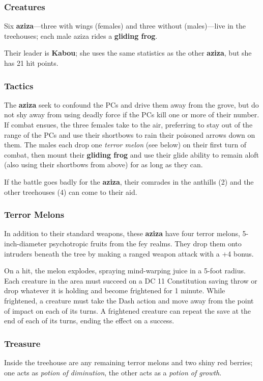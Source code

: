 \documentclass[10pt,a4paper,twoside,bg=print,twocolumn,openany,nodeprecatedcode]{dndbook}
\begin{document}
\subsubsection{Creatures}
Six \textbf{aziza}—three with wings (females) and three without (males)—live in the treehouses; each male aziza rides a \textbf{gliding frog}.

Their leader is \textbf{Kabou}; she uses the same statistics as the other \textbf{aziza}, but she has 21 hit points.

\subsubsection{Tactics}
The \textbf{aziza} seek to confound the PCs and drive them away from the grove, but do not shy away from using deadly force if the PCs kill one or more of their number. If combat ensues, the three females take to the air, preferring to stay out of the range of the PCs and use their shortbows to rain their poisoned arrows down on them. The males each drop one \textit{terror melon} (see below) on their first turn of combat, then mount their \textbf{gliding frog} and use their glide ability to remain aloft (also using their shortbows from above) for as long as they can.

If the battle goes badly for the \textbf{aziza}, their comrades in the anthills (2) and the other treehouses (4) can come to their aid.

\subsubsection{Terror Melons}
In addition to their standard weapons, these \textbf{aziza} have four terror melons, 5-inch-diameter psychotropic fruits from the fey realms. They drop them onto intruders beneath the tree by making a ranged weapon attack with a +4 bonus.

On a hit, the melon explodes, spraying mind-warping juice in a 5-foot radius. Each creature in the area must succeed on a DC 11 Constitution saving throw or drop whatever it is holding and become frightened for 1 minute. While frightened, a creature must take the Dash action and move away from the point of impact on each of its turns. A frightened creature can repeat the save at the end of each of its turns, ending the effect on a success.

\subsubsection{Treasure}
Inside the treehouse are any remaining terror melons and two shiny red berries; one acts as \textit{potion of diminution}, the other acts as a \textit{potion of growth}.
\end{document}
